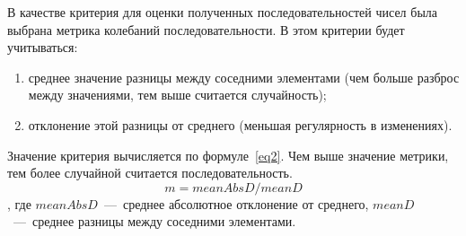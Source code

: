 В качестве критерия для оценки полученных последовательностей чисел была выбрана метрика колебаний последовательности.
В этом критерии будет учитываться:
\begin{enumerate}
	\item среднее значение разницы между соседними элементами (чем больше разброс между	значениями, тем выше считается случайность);
	\item отклонение этой разницы от среднего (меньшая регулярность в изменениях).
\end{enumerate}

Значение критерия вычисляется по формуле~\ref{eq2}.
Чем выше значение метрики, тем более случайной считается последовательность.
\begin{equation}
	\label{eq2}
	m =  meanAbsD/ meanD
\end{equation}
, где $meanAbsD$~---~среднее абсолютное отклонение от среднего,
$meanD$~---~среднее разницы между соседними элементами.
